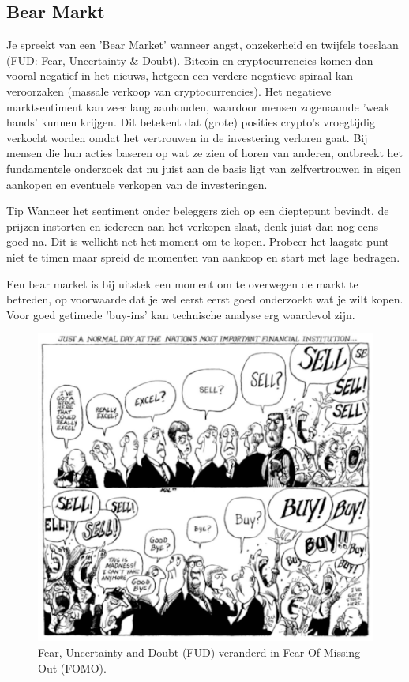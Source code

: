\subsection{Bear Markt}
Je spreekt van een 'Bear Market' wanneer angst, onzekerheid en twijfels toeslaan (FUD: Fear, Uncertainty \& Doubt). Bitcoin en cryptocurrencies komen dan vooral negatief in het nieuws, hetgeen een verdere negatieve spiraal kan veroorzaken (massale verkoop van cryptocurrencies). Het negatieve marktsentiment kan zeer lang aanhouden, waardoor mensen zogenaamde 'weak hands' kunnen krijgen. Dit betekent dat (grote) posities crypto's vroegtijdig verkocht worden omdat het vertrouwen in de investering verloren gaat. Bij mensen die hun acties baseren op wat ze zien of horen van anderen, ontbreekt het fundamentele onderzoek dat nu juist aan de basis ligt van zelfvertrouwen in eigen aankopen en eventuele verkopen van de investeringen. 

    \medskip
    \begin{tipbox}{Tip}
    Wanneer het sentiment onder beleggers zich op een dieptepunt bevindt, de prijzen instorten en iedereen aan het verkopen slaat, denk juist dan nog eens goed na. Dit is wellicht net het moment om te kopen. Probeer het laagste punt niet te timen maar spreid de momenten van aankoop en start met lage bedragen. 
    \end{tipbox}\medskip
    \medskip

Een bear market is bij uitstek een moment om te overwegen de markt te betreden, op voorwaarde dat je wel eerst eerst goed onderzoekt wat je wilt kopen. Voor goed getimede 'buy-ins' kan technische analyse erg waardevol zijn.\medskip


    \begin{figure}
    \centering
    \includegraphics[width=.6\textwidth]{img/ch-investing/FOMOFUD.png}
    \caption{Fear, Uncertainty and Doubt (FUD) veranderd in Fear Of Missing Out (FOMO).}
    \label{fig:FOMOFUD}
    \end{figure}
    \medskip


